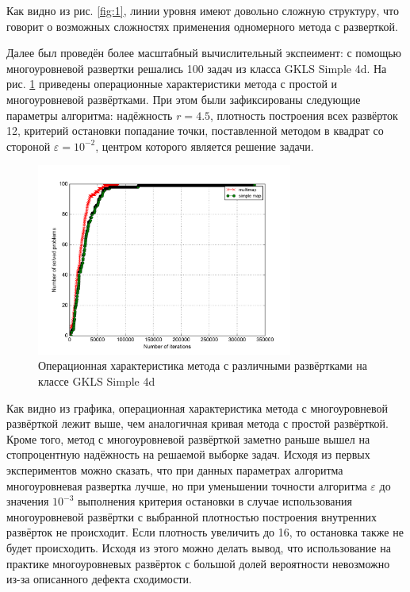 Как видно из рис. \ref{fig:1}, линии уровня имеют довольно сложную структуру, что говорит о возможных сложностях применения одномерного метода с разверткой.
\par
Далее был проведён более масштабный вычислительный экспеимент: с помощью многоуровневой развертки решались 100 задач из класса GKLS Simple 4d. На рис. \ref{fig:multimapOP} приведены операционные
характеристики метода с простой и многоуровневой развёртками. При этом были зафиксированы следующие параметры алгоритма: надёжность \(r=4.5\), плотность построения всех развёрток 12, критерий остановки попадание
точки, поставленной методом в квадрат со стороной \(\varepsilon=10^{-2}\), центром которого является решение задачи.
\begin{figure}[ht]
	\center
  \includegraphics[width=0.75\textwidth]{pictures/multimap_op.png}
  \caption{Операционная характеристика метода с различными развёртками на классе GKLS Simple 4d}
  \label{fig:multimapOP}
\end{figure}
Как видно из графика, операционная характеристика метода с многоуровневой развёрткой лежит выше, чем аналогичная кривая метода с простой развёрткой. Кроме того, метод с многоуровневой развёрткой
заметно раньше вышел на стопроцентную надёжность на решаемой выборке задач. Исходя из первых экспериментов можно сказать, что при данных параметрах алгоритма многоуровневая развертка лучше, но
при уменьшении точности алгоритма \(\varepsilon\) до значения \(10^{-3}\) выполнения критерия остановки в случае использования многоуровневой развёртки с выбранной плотностью построения внутренних развёрток не происходит.
Если плотность увеличить до 16, то остановка также не будет происходить. Исходя из этого можно делать вывод, что использование на практике многоуровневых развёрток с большой долей вероятности
невозможно из-за описанного дефекта сходимости.
